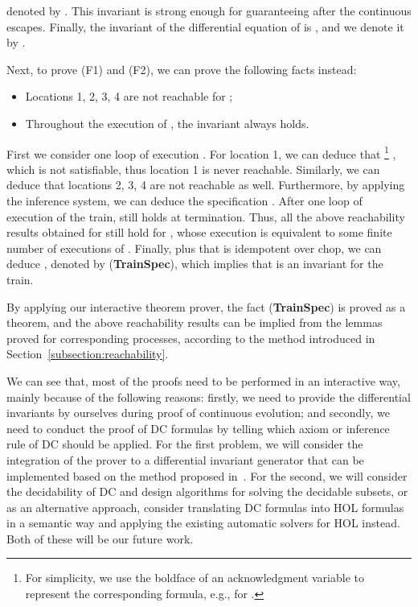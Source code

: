 \documentclass{llncs}
\begin{document}
denoted by . This invariant is strong enough for guaranteeing  after the continuous escapes.
Finally, the invariant of the differential equation of  is , and we denote it by .

Next, to prove (F1) and (F2), we can prove the following facts instead:
\begin{itemize}
\item Locations 1, 2, 3, 4 are not reachable for ;
\item Throughout the execution of ,
the invariant  always holds.
\end{itemize}
First we consider one loop of execution .
For location 1, we can deduce that \footnote{For simplicity, we use the boldface of an acknowledgment  variable to represent the corresponding
  formula, e.g.,  for .}
, which
is not satisfiable, thus location 1 is never  reachable.
Similarly, we can deduce that locations 2, 3, 4 are not reachable as well.  Furthermore, by applying the inference system, we can deduce the  specification
.
After one loop  of execution of the train,  still holds at termination. Thus,
all the above reachability  results obtained for  still hold for ,  whose execution
is equivalent to some  finite number of executions of  .
Finally, plus that  is idempotent over chop, we
can deduce
, denoted by (\textbf{TrainSpec}),
which
implies that  is an invariant for the train.

By applying  our interactive theorem prover, the fact (\textbf{TrainSpec}) is proved as a theorem, and
the above reachability results can be implied from the lemmas proved for corresponding processes, according to
the method introduced in Section~\ref{subsection:reachability}.

We can see that, most of the proofs need to be performed in an interactive way,
mainly because of the following reasons: firstly, we need to provide the differential invariants by ourselves during proof
of continuous evolution; and
secondly, we need to conduct the proof of DC formulas by telling
which axiom or inference rule of DC should be applied.  For the first problem, we will consider
the integration of the prover to a differential invariant generator that can be implemented based on the method
proposed in~\cite{LZZ11}. For the second, we will consider  the decidability
of DC and design algorithms for solving the decidable subsets, or as an alternative approach,
consider translating DC formulas into HOL formulas in a semantic way and
applying the existing automatic solvers for HOL instead. Both of these will be our future work.
\end{document}
